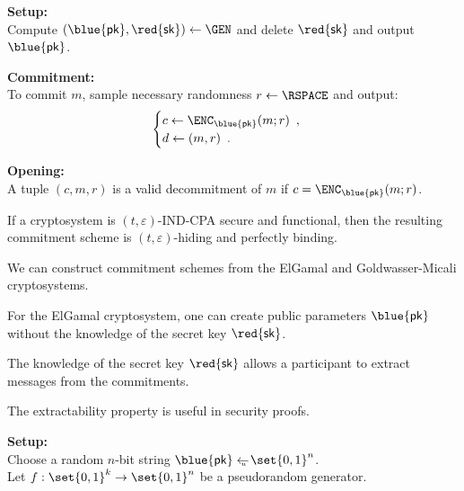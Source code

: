\documentclass[landscape,footrule]{foils}
\newcommand{\lastline}{\vspace*{-2ex}}
\newcommand{\spreadappart}{\vspace*{\fill}}
\renewcommand{\SK}{{\red{\mathsf{sk}}}}
\renewcommand{\PK}{{\blue{\mathsf{pk}}}}
\begin{document}

\textbf{Setup:}\vspace*{1ex}\\
\hspace*{1.5em} Compute $(\PK,\SK)\gets\GEN$ and delete $\SK$ and output $\PK$.
\bigskip
\spreadappart

\textbf{Commitment:}\vspace*{1ex}\\
\hspace*{1.5em} To commit $m$, sample necessary randomness
$r\gets\RSPACE$ and output:
\begin{align*}
  \begin{cases}
    c\gets\ENC_\PK(m;r)\enspace,\\
    d\gets (m,r)\enspace.
  \end{cases}
\end{align*}
\spreadappart

\textbf{Opening:}\vspace*{1ex}\\
\hspace*{1.5em} A tuple $(c,m,r)$ is a valid decommitment of $m$ if $c=\ENC_\PK(m;r)$. 
\lastline



If a cryptosystem is $(t,\varepsilon)$-IND-CPA secure and functional,
then the resulting commitment scheme is $(t,\varepsilon)$-hiding and
perfectly binding.

\vskip 1cm

\begin{diamonds}
\item We can construct commitment schemes from the ElGamal and
  Goldwasser-Micali cryptosystems.
\item For the ElGamal cryptosystem, one can create public parameters
  $\PK$ without the knowledge of the secret key $\SK$.
\item The knowledge of the secret key $\SK$ allows a participant to
  extract messages from the commitments.
\item The extractability property is useful in security proofs.
\end{diamonds}





\textbf{Setup:}\vspace*{1ex}\\
\hspace*{1.5em} Choose a random $n$-bit string $\PK\getsu\set{0,1}^n$. \\
\hspace*{1.5em} Let $f:\set{0,1}^k\to\set{0,1}^n$ be a pseudorandom generator. 
\bigskip
\spreadappart
\end{document}
